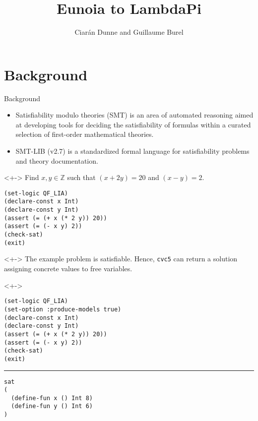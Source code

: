 \documentclass[lualatex, compress, 12pt, handout]{beamer}
\title{Eunoia to LambdaPi}
\author{Ciarán Dunne and Guillaume Burel}
\institute{ENS Paris-Saclay, INRIA}
\begin{document}
\frame[plain]{\titlepage}

\section{Background}

\begin{frame}{Background}
	\begin{itemize}
		\item<+-> \alert{Satisfiability modulo theories} (SMT)
		      is an area of automated reasoning aimed at
		      developing tools for deciding the satisfiability
		      of formulas within a curated selection of
		      first-order mathematical theories.
		\item<+-> \alert{SMT-LIB} (v2.7) is a standardized
		      formal language for satisfiability problems
		      and theory documentation.
	\end{itemize}
	\begin{uncoverenv}<+->
		\exxample
		Find $x,y ∈ ℤ$ such that $(x + 2y) = 20$ and $(x - y) = 2$.
		\begin{lstlisting}
(set-logic QF_LIA)
(declare-const x Int)
(declare-const y Int)
(assert (= (+ x (* 2 y)) 20))
(assert (= (- x y) 2))
(check-sat)
(exit)\end{lstlisting}
	\end{uncoverenv}
\end{frame}

\begin{frame}
	\begin{uncoverenv}<+->
		\exxample
		The example problem is \alert{satisfiable}.
		Hence, \texttt{cvc5} can return a \alert{solution}
		assigning concrete values to free variables.
	\end{uncoverenv}
	\begin{uncoverenv}<+->
		\begin{lstlisting}
(set-logic QF_LIA)
(set-option :produce-models true)
(declare-const x Int)
(declare-const y Int)
(assert (= (+ x (* 2 y)) 20))
(assert (= (- x y) 2))
(check-sat)
(exit)
\end{lstlisting}
		\hrule
		\begin{lstlisting}
sat
(
  (define-fun x () Int 8)
  (define-fun y () Int 6)
)\end{lstlisting}
	\end{uncoverenv}
\end{frame}
\end{document}
